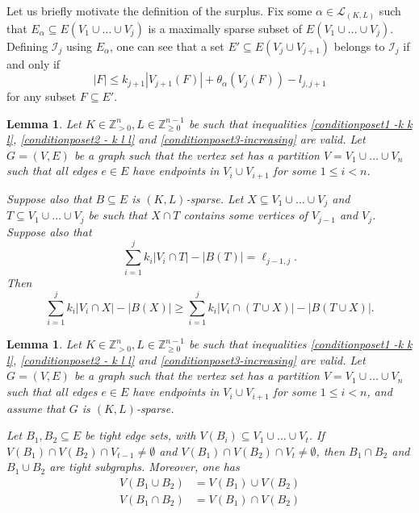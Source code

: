 \documentclass[10pt,a4paper]{article}
\newtheorem{lemma}[theorem]{Lemma}
\begin{document}
Let us briefly motivate the definition of the surplus.
Fix some $\alpha \in \mathcal{L}_{(K,L)}$ such that $E_{\alpha} \subseteq E(V_1 \cup \dots \cup V_j)$ is a maximally sparse subset of $ E(V_1\cup \dots \cup V_j)$. Defining $\mathcal{I}_j$ using $E_{\alpha}$, one can see that a set $E'\subseteq E(V_j\cup V_{j+1})$ belongs to $\mathcal{I}_j$ if and only if
\begin{equation}
    |F|\leq k_{j+1}|V_{j+1}(F)| + \theta_{\alpha}(V_{j}(F)) - l_{j,j+1}
    \label{def:matroid}
\end{equation}
for any subset $F \subseteq E'$.  

\begin{lemma}\label{Increase_when_tight - greedoids}
Let $K\in \mathbb{Z}_{>0}^{n}, L\in \mathbb{Z}_{\geq 0}^{n-1}$ be such that inequalities \eqref{conditionposet1 -k k l}, \eqref{conditionposet2 - k l l} and \eqref{conditionposet3-increasing} are valid. Let $G=(V,E)$ be a graph such that the vertex set has a partition $V=V_1\cup \dots \cup V_n$ such that all edges $e\in E$ have endpoints in $V_{i} \cup V_{i+1}$ for some $1 \leq i < n$. 

Suppose also that $B \subseteq E$ is $(K,L)$-sparse. Let $X\subseteq V_{1}\cup \dots \cup V_{j}$ and $T \subseteq V_{1}\cup \dots \cup V_{j}$ be such that $X\cap T$ contains some vertices of $V_{j-1}$ and $V_{j}$. Suppose also that
\begin{equation*}
\sum_{i=1}^{j} k_i |V_i\cap T| - |B(T)|  = \ell_{j-1, j}. 
\end{equation*}
Then
\begin{equation*}
\sum_{i=1}^{j} k_i |V_i \cap X| - |B(X)|  \geq \sum_{i=1}^{j} k_i |V_i\cap (T\cup X)| - |B(T\cup X)|. 
\end{equation*}
\end{lemma}

\begin{lemma}\label{blocks}
Let $K\in \mathbb{Z}_{>0}^{n}, L\in \mathbb{Z}_{\geq 0}^{n-1}$ be such that inequalities \eqref{conditionposet1 -k k l}, \eqref{conditionposet2 - k l l} and \eqref{conditionposet3-increasing} are valid. Let $G=(V,E)$ be a graph such that the vertex set has a partition $V=V_1\cup \dots \cup V_n$ such that all edges $e\in E$ have endpoints in $V_{i} \cup V_{i+1}$ for some $1 \leq i < n$, and assume that $G$ is $(K,L)$-sparse. 

Let $B_1, B_2 \subseteq E$ be tight edge sets, with $V(B_i)\subseteq V_1\cup \dots \cup V_t$. If $V(B_1)\cap V(B_2) \cap V_{t-1} \neq \emptyset$ and $V(B_1)\cap V(B_2) \cap V_{t} \neq \emptyset$, then $B_1 \cap B_2$ and $B_1\cup B_2$ are tight subgraphs.
Moreover, one has
\begin{align*}
    V(B_1\cup B_2) &= V(B_1) \cup V(B_2)\\
    V(B_1\cap B_2) &= V(B_1) \cap V(B_2)
\end{align*}
\end{lemma}
\end{document}
